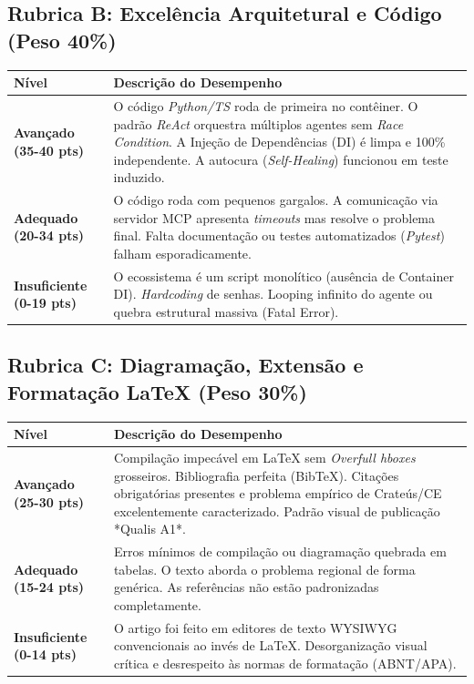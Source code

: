 \documentclass[12pt,a4paper]{article}
\begin{document}
\subsection{Rubrica B: Excelência Arquitetural e Código (Peso 40\%)}
\begin{table}[h]
\centering
\begin{tabular}{|p{}|p{}|}
\hline
\textbf{Nível} & \textbf{Descrição do Desempenho} \\
\hline
\textbf{Avançado (35-40 pts)} & O código \textit{Python/TS} roda de primeira no contêiner. O padrão \textit{ReAct} orquestra múltiplos agentes sem \textit{Race Condition}. A Injeção de Dependências (DI) é limpa e 100\% independente. A autocura (\textit{Self-Healing}) funcionou em teste induzido. \\
\hline
\textbf{Adequado (20-34 pts)} & O código roda com pequenos gargalos. A comunicação via servidor MCP apresenta \textit{timeouts} mas resolve o problema final. Falta documentação ou testes automatizados (\textit{Pytest}) falham esporadicamente. \\
\hline
\textbf{Insuficiente (0-19 pts)} & O ecossistema é um script monolítico (ausência de Container DI). \textit{Hardcoding} de senhas. Looping infinito do agente ou quebra estrutural massiva (Fatal Error). \\
\hline
\end{tabular}
\end{table}

\subsection{Rubrica C: Diagramação, Extensão e Formatação LaTeX (Peso 30\%)}
\begin{table}[h]
\centering
\begin{tabular}{|p{}|p{}|}
\hline
\textbf{Nível} & \textbf{Descrição do Desempenho} \\
\hline
\textbf{Avançado (25-30 pts)} & Compilação impecável em LaTeX sem \textit{Overfull hboxes} grosseiros. Bibliografia perfeita (BibTeX). Citações obrigatórias presentes e problema empírico de Crateús/CE excelentemente caracterizado. Padrão visual de publicação *Qualis A1*. \\
\hline
\textbf{Adequado (15-24 pts)} & Erros mínimos de compilação ou diagramação quebrada em tabelas. O texto aborda o problema regional de forma genérica. As referências não estão padronizadas completamente. \\
\hline
\textbf{Insuficiente (0-14 pts)} & O artigo foi feito em editores de texto WYSIWYG convencionais ao invés de LaTeX. Desorganização visual crítica e desrespeito às normas de formatação (ABNT/APA). \\
\hline
\end{tabular}
\end{table}
\end{document}
